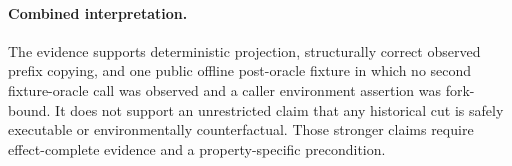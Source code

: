 \paragraph{Combined interpretation.}
The evidence supports deterministic projection, structurally correct observed
prefix copying, and one public offline post-oracle fixture in which no second
fixture-oracle call was observed and a caller environment assertion was
fork-bound.  It does not support an unrestricted claim that any historical cut
is safely executable or environmentally counterfactual.  Those stronger claims
require effect-complete evidence and a property-specific precondition.
